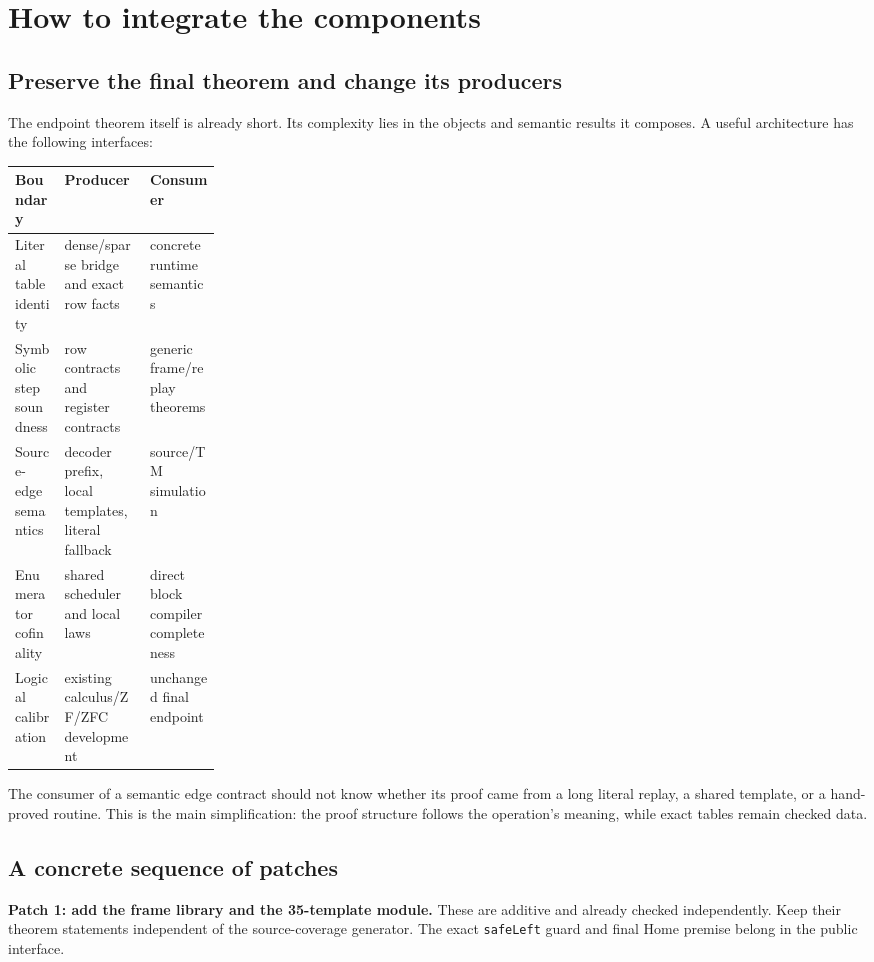 \documentclass[11pt,letterpaper]{article}
\theoremstyle{definition}
\theoremstyle{remark}
\newcommand{\code}[1]{\texttt{#1}}
\begin{document}
\section{How to integrate the components}
\label{sec:integration}

\subsection{Preserve the final theorem and change its producers}

The endpoint theorem itself is already short. Its complexity lies in the
objects and semantic results it composes. A useful architecture has the
following interfaces:

\begin{center}\small
\begin{tabularx}{\linewidth}{@{}p{0.24\linewidth}XX@{}}
\toprule
Boundary & Producer & Consumer\\
\midrule
Literal table identity & dense/sparse bridge and exact row facts & concrete runtime semantics\\
Symbolic step soundness & row contracts and register contracts & generic frame/replay theorems\\
Source-edge semantics & decoder prefix, local templates, literal fallback & source/TM simulation\\
Enumerator cofinality & shared scheduler and local laws & direct block compiler completeness\\
Logical calibration & existing calculus/ZF/ZFC development & unchanged final endpoint\\
\bottomrule
\end{tabularx}
\end{center}

The consumer of a semantic edge contract should not know whether its proof
came from a long literal replay, a shared template, or a hand-proved routine.
This is the main simplification: the proof structure follows the operation's
meaning, while exact tables remain checked data.

\subsection{A concrete sequence of patches}

\textbf{Patch 1: add the frame library and the 35-template module.}
These are additive and already checked independently. Keep their theorem
statements independent of the source-coverage generator. The exact
\code{safeLeft} guard and final Home premise belong in the public interface.
\end{document}
